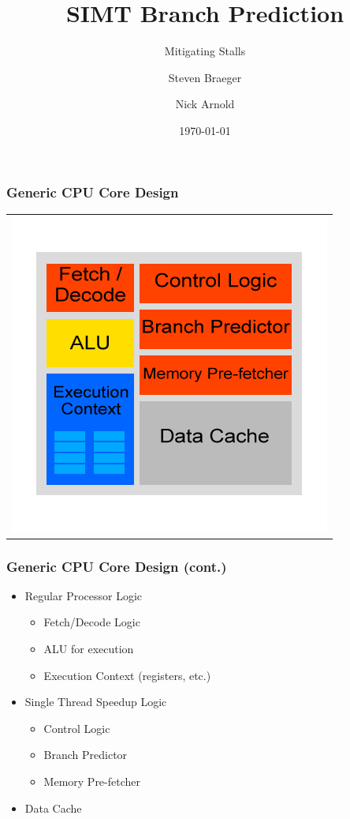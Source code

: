 \documentclass{beamer}
\title
{SIMT Branch Prediction}
\subtitle{Mitigating Stalls}
\author
{Steven Braeger \and Nick Arnold}
\institute
{
  \inst{1}%
  University of Central Florida
}
\date
{\today}
\begin{document}
\frame{\titlepage}

\begin{frame}
	\frametitle{Generic CPU Core Design}
	\begin{tabular}{c}
		\includegraphics[width=.75\textwidth]{CPU-design.jpg}
	\end{tabular}
\end{frame}

\begin{frame}
	\frametitle{Generic CPU Core Design (cont.)}
	\begin{itemize}
		\item Regular Processor Logic
		\begin{itemize}
			\item Fetch/Decode Logic
			\item ALU for execution
			\item Execution Context (registers, etc.)
		\end{itemize}
		\item Single Thread Speedup Logic
		\begin{itemize}
			\item Control Logic
			\item Branch Predictor
			\item Memory Pre-fetcher
		\end{itemize}
		\item Data Cache
	\end{itemize}
\end{frame}
\end{document}
